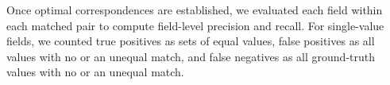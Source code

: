 


Once optimal correspondences are established, we evaluated each field
within each matched pair to compute field-level precision and recall. For single-value fields, we counted true positives as sets of equal values, false positives as all \name{} values with no or an unequal match, and false negatives as all ground-truth values with no or an unequal match.

